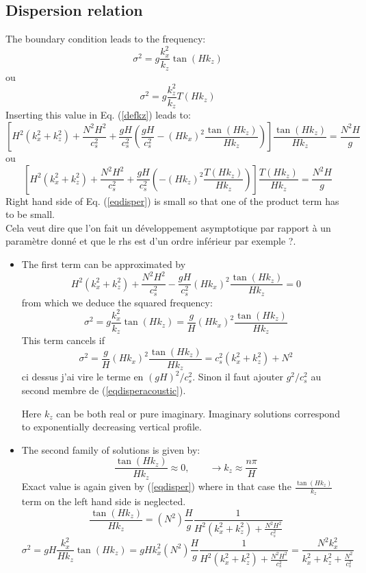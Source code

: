 \documentclass[a4paper]{article}
\numberwithin{equation}{section}
\begin{document}
\subsection{Dispersion relation}
The boundary condition leads to the frequency:
\[
\sigma^2=g\frac{k_x^2}{k_z}\tan(Hk_z)
\]
\color{blue}
ou
\[
\sigma^2=g\frac{k_z^2}{k_z}T(Hk_z)
\]
\color{black}
Inserting this value in Eq. (\ref{defkz}) leads to:
\begin{equation}
\left[
H^2
\left(k_x^2+k_z^2\right)
+\frac{N^2H^2}{c_s^2}+\frac{gH}{c_s^2}\left(\frac{gH}{c_s^2}
-(Hk_x)^2\frac{\tan(Hk_z)}{Hk_z}
\right)
\right]\frac{\tan(Hk_z)}{Hk_z}=\frac{N^2H}{g}
\label{eqdisper}
\end{equation}
\color{blue}
ou
\begin{equation}
\left[
H^2
\left(k_x^2+k_z^2\right)
+\frac{N^2H^2}{c_s^2}+\frac{gH}{c_s^2}\left(
-(Hk_z)^2\frac{T(Hk_z)}{Hk_z}
\right)
\right]\frac{T(Hk_z)}{Hk_z}=\frac{N^2H}{g}
\label{eqdisper2}
\end{equation}
\color{black}
Right hand side of Eq. (\ref{eqdisper}) is small so that one of the product term has to be small.\\
\color{blue} 
Cela veut dire que l'on fait un développement asymptotique par rapport à un paramètre donné et que le rhs est d'un ordre inférieur par exemple ?.\\
\color{black}
\begin{itemize}
\item
The first term can be approximated by
\[
H^2
\left(k_x^2+k_z^2\right)
+\frac{N^2H^2}{c_s^2}-\frac{gH}{c_s^2}(Hk_x)^2\frac{\tan(Hk_z)}{Hk_z}=0
\]
from which we deduce the squared frequency:
\[
\sigma^2=g\frac{k_x^2}{k_z}\tan(Hk_z)=\frac{g}{H}(Hk_x)^2\frac{\tan(Hk_z)}{Hk_z}
\]
This term cancels if
\begin{equation}
\sigma^2=\frac{g}{H}(Hk_x)^2\frac{\tan(Hk_z)}{Hk_z}=
c_s^2\left(k_x^2+k_z^2\right)+N^2
\label{eqdisperacoustic}
\end{equation}
{\color{red}ci dessus j'ai vire le terme en $(gH)^2/c_s^2$. Sinon il faut ajouter $g^2/c_s^2$ au second membre de (\ref{eqdisperacoustic})}.

Here $k_z$ can be both real or pure imaginary. Imaginary solutions correspond to exponentially decreasing vertical profile.

\item The second family of solutions is given by:
\[
\frac{\tan(Hk_z)}{Hk_z}\approx 0,\qquad \rightarrow k_z\approx \frac{n\pi}{H}
\]
Exact value is again given by (\ref{eqdisper}) where in that case the $\frac{\tan(Hk_z)}{k_z}$ term on the left hand side is neglected.
\[
\frac{\tan(Hk_z)}{Hk_z}=\left(
N^2
\right)\frac{H}{g}\frac{1}{H^2
\left(k_x^2+k_z^2\right)+\frac{N^2H^2}{c_s^2}}
\]
\[
\sigma^2=gH\frac{k_x^2}{Hk_z}\tan(Hk_z)=gHk_x^2\left(
N^2
\right)\frac{H}{g}\frac{1}{H^2
\left(k_x^2+k_z^2\right)+\frac{N^2H^2}{c_s^2}}
=\frac{N^2k_x^2}{k_x^2+k_z^2+\frac{N^2}{c_s^2}}
\]
\end{itemize}
\newpage
\end{document}
